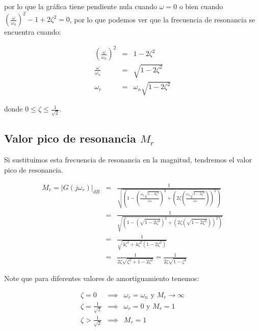             por lo que la gráfica tiene pendiente nula cuando $\omega = 0$ o bien cuando $\left( \frac{\omega}{\omega_n} \right)^2 - 1 + 2 \zeta^2 = 0$, por lo que podemos ver que la frecuencia de resonancia se encuentra cuando:

            \begin{eqnarray*}
                \left( \frac{\omega}{\omega_n} \right)^2 & = & 1 - 2 \zeta^2 \\
                \frac{\omega}{\omega_n} & = & \sqrt{1 - 2 \zeta^2} \\
                \omega_r & = & \omega_n \sqrt{1 - 2 \zeta^2}
            \end{eqnarray*}

            donde $0 \le \zeta \le \frac{1}{\sqrt{2}}$.


        \subsection{Valor pico de resonancia $M_r$}

            Si sustituimos esta frecuencia de resonancia en la magnitud, tendremos el valor pico de resonancia.

            \begin{eqnarray*}
                M_r = \left| G(j \omega_r) \right|_{dB} & = & \frac{1}{\sqrt{\left( 1 - \left( \frac{\omega_n \sqrt{1 - 2 \zeta^2}}{\omega_n} \right)^2 + \left( 2 \zeta \left( \frac{\omega_n \sqrt{1 - 2 \zeta^2}}{\omega_n} \right) \right)^2 \right)}} \\
                & = & \frac{1}{\sqrt{\left( 1 - \left( \sqrt{1 - 2 \zeta^2} \right)^2 + \left( 2 \zeta \left( \sqrt{1 - 2 \zeta^2} \right) \right)^2 \right)}} \\
                & = & \frac{1}{\sqrt{4 \zeta^4 + 4 \zeta^2 \left( 1 - 2 \zeta^2 \right)}} \\
                & = & \frac{1}{2 \zeta \sqrt{\zeta^2 + 1 - 2 \zeta^2}} = \frac{1}{2 \zeta \sqrt{1 - \zeta^2}}
            \end{eqnarray*}

            Note que para diferentes valores de amortiguamiento tenemos:

            \begin{eqnarray*}
                \zeta = 0 & \implies & \omega_r = \omega_n \text{ y } M_r \to \infty \\
                \zeta = \frac{1}{\sqrt{2}} & \implies & \omega_r = 0 \text{ y } M_r = 1 \\
                \zeta > \frac{1}{\sqrt{2}} & \implies & M_r = 1
            \end{eqnarray*}

